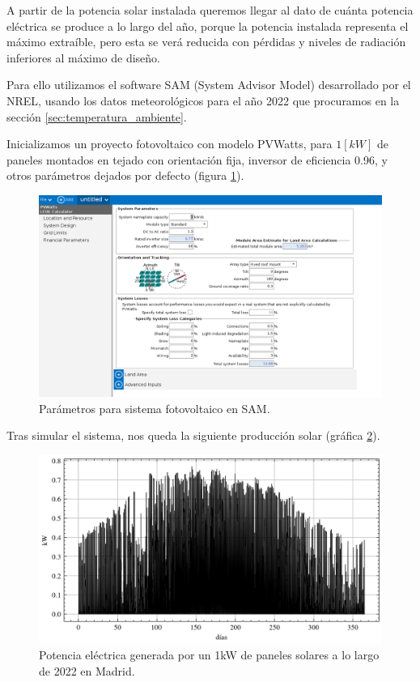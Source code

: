 A partir de la potencia solar instalada queremos llegar al dato de cuánta
potencia eléctrica se produce a lo largo del año, porque la potencia instalada
representa el máximo extraíble, pero esta se verá reducida con pérdidas y
niveles de radiación inferiores al máximo de diseño.

Para ello utilizamos el software SAM \cite{SAM2023} (System Advisor Model)
desarrollado por el NREL, usando los datos meteorológicos para el año 2022 que
procuramos en la sección \ref{sec:temperatura_ambiente}.

Inicializamos un proyecto fotovoltaico con modelo PVWatts, para $1[kW]$ de
paneles montados en tejado con orientación fija, inversor de eficiencia 0.96, y
otros parámetros dejados por defecto (figura \ref{fig:sam_solar_parameters}).

\begin{figure}[h] \centering
	\centering
	\includegraphics[width=1\textwidth]{./capitulos/adquisicion_de_datos/images/sam_solar_parameters.png}
	\caption{Parámetros para sistema fotovoltaico en SAM.}
	\label{fig:sam_solar_parameters}
\end{figure}

Tras simular el sistema, nos queda la siguiente producción solar (gráfica
\ref{fig:solar_production}).

\begin{figure}[h] \centering
	\centering
	\includegraphics[width=1\textwidth]{./capitulos/adquisicion_de_datos/images/solar_production.png}
	\caption{Potencia eléctrica generada por un 1kW de paneles solares a lo largo
		de 2022 en Madrid.}
	\label{fig:solar_production}
\end{figure}

